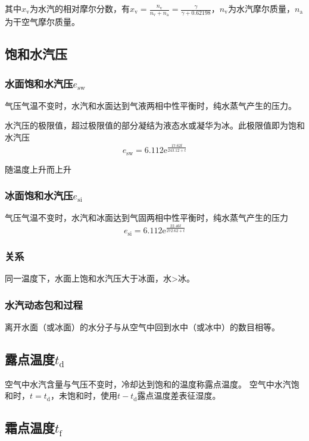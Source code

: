 \documentclass[UTF8,11pt]{ctexbook}
\begin{document}
其中\(x_\mathrm{v}\)为水汽的相对摩尔分数，有\(x_\mathrm{v}=\frac{n_\mathrm{v}}{n_\mathrm{v}+n_\mathrm{a}}=\frac{\gamma}{\gamma+0.62198}\)，\(n_\mathrm{v}\)为水汽摩尔质量，\(n_\mathrm{a}\)为干空气摩尔质量。

\subsection{饱和水汽压}


\subsubsection{水面饱和水汽压\(e_\mathrm{sw}\)}

气压气温不变时，水汽和水面达到气液两相中性平衡时，纯水蒸气产生的压力。

水汽压的极限值，超过极限值的部分凝结为液态水或凝华为冰。此极限值即为饱和水汽压
\[
e_\mathrm{sw}=6.112\mathrm{e}^{\frac{17.62t}{243.12+t}}
\]

随温度上升而上升

\subsubsection{冰面饱和水汽压\(e_\mathrm{si}\)}

气压气温不变时，水汽和冰面达到气固两相中性平衡时，纯水蒸气产生的压力
\[
e_\mathrm{si}=6.112\mathrm{e}^\frac{22.46t}{272.62+t}
\]

\subsubsection{关系}

同一温度下，水面上饱和水汽压大于冰面，水>冰。

\subsubsection{水汽动态包和过程}

离开水面（或冰面）的水分子与从空气中回到水中（或冰中）的数目相等。

\subsection{露点温度\(t_\mathrm{d}\)}

空气中水汽含量与气压不变时，冷却达到饱和的温度称露点温度。
空气中水汽饱和时，\(t=t_\mathrm{d}\)，未饱和时，使用\(t-t_\mathrm{d}\)露点温度差表征湿度。

\subsection{霜点温度\(t_\mathrm{f}\)}
\end{document}
